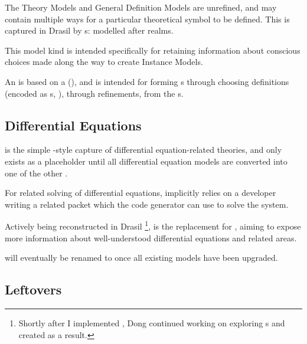 \currentMultiDefnHaskell{}

The Theory Models and General Definition Models are unrefined, and may contain
multiple ways for a particular theoretical symbol to be defined. This is
captured in Drasil by \EquationalRealm{}s: modelled after realms.

This model kind is intended specifically for retaining information about
conscious choices made along the way to create Instance Models.

An \EquationalRealm{} is based on a \MultiDefn{}
(), and is intended for forming \QDefinition{}s
through choosing definitions (encoded as \DefiningExpr{}s,
), through refinements, from the \MultiDefn{}s.


\subsection{Differential Equations}

\DEModel{} is the simple \RelationConcept{}-style capture of differential
equation-related theories, and only exists as a placeholder until all
differential equation models are converted into one of the other \ModelKinds{}.

For related solving of differential equations, \DEModel{} implicitly relies on a
developer writing a related \ODEInfo{} packet which
the code generator can use to solve the system.

Actively being reconstructed in Drasil \cite{Chen2022MEng} \footnote{Shortly
after I implemented \ModelKind{}, Dong continued working on exploring
\DEModel{}s and created \NewDEModel{} as a result.}, \NewDEModel{} is the
replacement for \DEModel{}, aiming to expose more information about
well-understood differential equations and related areas.

\NewDEModel{} will eventually be renamed to \DEModel{} once all existing
\DEModel{} models have been upgraded.


\subsection{Leftovers}

